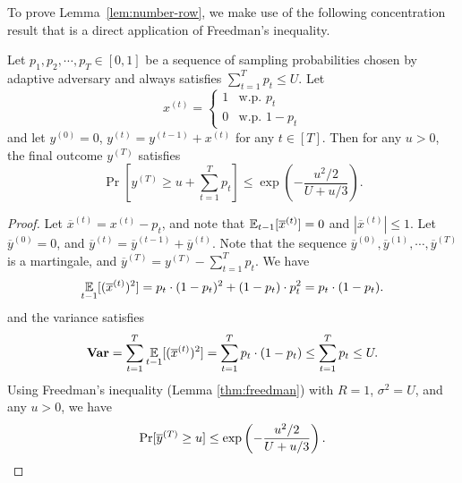 To prove Lemma~\ref{lem:number-row}, we make use of the following concentration result that is a direct application of Freedman's inequality.
\begin{lemma}
\label{lem:number_sampled_rows-concentration}
Let $p_1, p_2, \cdots, p_T \in [0,1]$ be a sequence of sampling probabilities chosen by adaptive adversary and always satisfies $\sum_{t=1}^T p_t \leq U$. 
Let 
\[
x^{(t)} = 
\begin{cases}
1 & \text{w.p. } p_t \\
0 & \text{w.p. } 1 - p_t
\end{cases}
\]
and let $y^{(0)} = 0$, $y^{(t)} = y^{(t-1)} + x^{(t)}$ for any $t\in [T]$. Then for any $u > 0$,  the final outcome $y^{(T)}$ satisfies
\[
\Pr\left[y^{(T)} \geq u + \sum_{t=1}^T p_t  \right] \leq \exp\left(-\frac{u^2/2}{U + u/3}\right).
\]
\end{lemma}
\begin{proof}
Let $\overline{x}^{(t)} = x^{(t)} - p_t$, and note that $\operatorname*{{\mathbb{E}}}_{t-1}[\overline{x}^{(t)}] = 0$ and $|\overline{x}^{(t)}| \leq 1$. 
Let $\overline{y}^{(0)} = 0$, and $\overline{y}^{(t)} = \overline{y}^{(t-1)} + \overline{y}^{(t)}$. Note that the sequence $\overline{y}^{(0)}, \overline{y}^{(1)}, \cdots, \overline{y}^{(T)}$ is a martingale, and $\overline{y}^{(T)} = y^{(T)} - \sum_{t=1}^T p_t$.
We have
\[
\operatorname*{{\mathbb{E}}}_{t-1}[(\overline{x}^{(t)})^2] = p_t \cdot (1 - p_t)^2 + (1 - p_t) \cdot p_t^2 = p_t \cdot (1 - p_t).
\]
and the variance satisfies
\[
\operatorname*{{\bf {Var}}} = \sum_{t=1}^T \operatorname*{{\mathbb{E}}}_{t-1}[(\overline{x}^{(t)})^2]
= \sum_{t=1}^T p_t \cdot (1 - p_t) \leq \sum_{t=1}^T p_t \leq U.
\]
Using Freedman's inequality (Lemma \ref{thm:freedman}) with $R = 1$, $\sigma^2 = U$, and any $u > 0$, we have
\[
\Pr[\overline{y}^{(T)} \geq u] \leq \exp\left(-\frac{u^2/2}{U + u/3}\right). \qedhere
\]
\end{proof}


